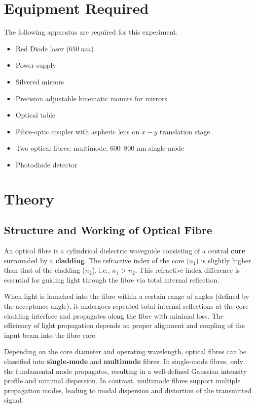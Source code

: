 \section{Equipment Required}
The following apparatus are required for this experiment:
\begin{itemize}
    \item Red Diode laser ($650 \ nm$)
    \item Power supply
    \item Silvered mirrors
    \item Precision adjustable kinematic mounts for mirrors
    \item Optical table
    \item Fibre-optic coupler with aspheric lens on $x-y$ translation stage
    \item Two optical fibres: multimode, 600–800 nm single-mode
    \item Photodiode detector
\end{itemize}
\section{Theory}
\subsection{Structure and Working of Optical Fibre}

An optical fibre is a cylindrical dielectric waveguide consisting of a central \textbf{core} surrounded by a \textbf{cladding}. The refractive index of the core ($n_1$) is slightly higher than that of the cladding ($n_2$), i.e., $n_1 > n_2$. This refractive index difference is essential for guiding light through the fibre via total internal reflection.

When light is launched into the fibre within a certain range of angles (defined by the acceptance angle), it undergoes repeated total internal reflections at the core--cladding interface and propagates along the fibre with minimal loss. The efficiency of light propagation depends on proper alignment and coupling of the input beam into the fibre core. 

Depending on the core diameter and operating wavelength, optical fibres can be classified into \textbf{single-mode} and \textbf{multimode} fibres. In single-mode fibres, only the fundamental mode propagates, resulting in a well-defined Gaussian intensity profile and minimal dispersion. In contrast, multimode fibres support multiple propagation modes, leading to modal dispersion and distortion of the transmitted signal.

